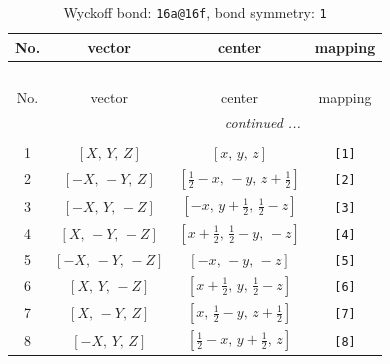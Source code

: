 \documentclass[fleqn,8pt]{jsarticle}
\begin{document}
\begin{longtable}{cccc}
\caption{Wyckoff bond: {\tt 16a@16f}, bond symmetry: {\tt 1}}
 \\
 \hline \hline
No. & vector & center & mapping \\ \hline \endfirsthead

\multicolumn{3}{l}{\tablename\ \thetable{}} \\
 \hline \hline
No. & vector & center & mapping \\ \hline \endhead

 \hline \hline
\multicolumn{3}{r}{\footnotesize\it continued ...} \\ \endfoot

 \hline \hline
\multicolumn{3}{r}{} \\ \endlastfoot

1 & $\left[ X,\, Y,\, Z \right]$ & $\left[ x,\, y,\, z \right]$ & {\tt [1]} \\ \hline
2 & $\left[ - X,\, - Y,\, Z \right]$ & $\left[ \frac{1}{2} - x,\, - y,\, z + \frac{1}{2} \right]$ & {\tt [2]} \\ \hline
3 & $\left[ - X,\, Y,\, - Z \right]$ & $\left[ - x,\, y + \frac{1}{2},\, \frac{1}{2} - z \right]$ & {\tt [3]} \\ \hline
4 & $\left[ X,\, - Y,\, - Z \right]$ & $\left[ x + \frac{1}{2},\, \frac{1}{2} - y,\, - z \right]$ & {\tt [4]} \\ \hline
5 & $\left[ - X,\, - Y,\, - Z \right]$ & $\left[ - x,\, - y,\, - z \right]$ & {\tt [5]} \\ \hline
6 & $\left[ X,\, Y,\, - Z \right]$ & $\left[ x + \frac{1}{2},\, y,\, \frac{1}{2} - z \right]$ & {\tt [6]} \\ \hline
7 & $\left[ X,\, - Y,\, Z \right]$ & $\left[ x,\, \frac{1}{2} - y,\, z + \frac{1}{2} \right]$ & {\tt [7]} \\ \hline
8 & $\left[ - X,\, Y,\, Z \right]$ & $\left[ \frac{1}{2} - x,\, y + \frac{1}{2},\, z \right]$ & {\tt [8]} \\
\end{longtable}
\end{document}
